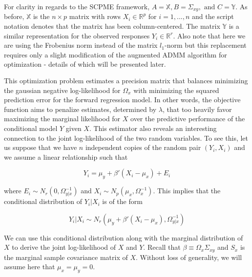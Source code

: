 \documentclass[11pt,]{report}
\theoremstyle{definition}
\theoremstyle{definition}
\theoremstyle{definition}
\theoremstyle{remark}
\begin{document}
For clarity in regards to the SCPME framework, \(A = \mathbb{X}, B = \Sigma_{xy}, \mbox{ and } C = \mathbb{Y}\). As before, \(\mathbb{X}\) is the \(n \times p\) matrix with rows \(X_{i} \in \mathbb{R}^{p}\) for \(i = 1,..., n\) and the script notation denotes that the matrix has been column-centered. The matrix \(\mathbb{Y}\) is a similar representation for the observed responses \(Y_{i} \in \mathbb{R}^{r}\). Also note that here we are using the Frobenius norm instead of the matrix \(l_{1}\)-norm but this replacement requires only a slight modification of the augmented ADMM algorithm for optimization - details of which will be presented later.

This optimization problem estimates a precision matrix that balances minimizing the gaussian negative log-likelihood for \(\Omega_{x}\) with minimizing the squared prediction error for the forward regression model. In other words, the objective function aims to penalize estimates, determined by \(\lambda\), that too heavily favor maximizing the marginal likelihood for \(X\) over the predictive performance of the conditional model \(Y\) given \(X\). This estimator also reveals an interesting connection to the joint log-likelihood of the two random variables. To see this, let us suppose that we have \(n\) independent copies of the random pair \((Y_{i}, X_{i})\) and we assume a linear relationship such that

\begin{equation}
Y_{i} = \mu_{y} + \beta'\left(X_{i} - \mu_{x}\right) + E_{i}
\end{equation}

where \(E_{i} \sim N_{r}\left( 0, \Omega_{y | x}^{-1} \right)\) and \(X_{i} \sim N_{p}\left( \mu_{x}, \Omega_{x}^{-1} \right)\). This implies that the conditional distribution of \(Y_{i}|X_{i}\) is of the form

\begin{equation}
Y_{i} | X_{i} \sim N_{r}\left( \mu_{y} + \beta'\left(X_{i} - \mu_{x}\right), \Omega_{y | x}^{-1} \right)
\end{equation}

We can use this conditional distribution along with the marginal distribution of \(X\) to derive the joint log-likelihood of \(X\) and \(Y\). Recall that \(\beta \equiv \Omega_{x}\Sigma_{xy}\) and \(S_{x}\) is the marginal sample covariance matrix of \(X\). Without loss of generality, we will assume here that \(\mu_{x} = \mu_{y} = 0\).
\end{document}
